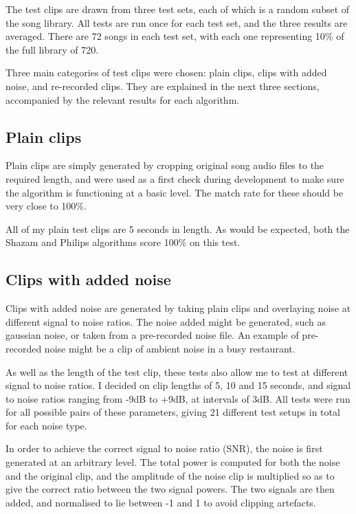 \documentclass[12pt,a4paper,twoside,openright]{report}
\begin{document}
The test clips are drawn from three test sets, each of which is a random subset of the song library. All tests are run once for each test set, and the three results are averaged. There are 72 songs in each test set, with each one representing 10\% of the full library of 720.

Three main categories of test clips were chosen: plain clips, clips with added noise, and re-recorded clips. They are explained in the next three sections, accompanied by the relevant results for each algorithm.


\subsection{Plain clips}

Plain clips are simply generated by cropping original song audio files to the required length, and were used as a first check during development to make sure the algorithm is functioning at a basic level. The match rate for these should be very close to 100\%.

All of my plain test clips are 5 seconds in length. As would be expected, both the Shazam and Philips algorithms score 100\% on this test.


\subsection{Clips with added noise}

Clips with added noise are generated by taking plain clips and overlaying noise at different signal to noise ratios. The noise added might be generated, such as gaussian noise, or taken from a pre-recorded noise file. An example of pre-recorded noise might be a clip of ambient noise in a busy restaurant.

As well as the length of the test clip, these tests also allow me to test at different signal to noise ratios. I decided on clip lengths of 5, 10 and 15 seconds, and signal to noise ratios ranging from -9dB to +9dB, at intervals of 3dB. All tests were run for all possible pairs of these parameters, giving 21 different test setups in total for each noise type. 

In order to achieve the correct signal to noise ratio (SNR), the noise is first generated at an arbitrary level. The total power is computed for both the noise and the original clip, and the amplitude of the noise clip is multiplied so as to give the correct ratio between the two signal powers. The two signals are then added, and normalised to lie between -1 and 1 to avoid clipping artefacts.
\end{document}
